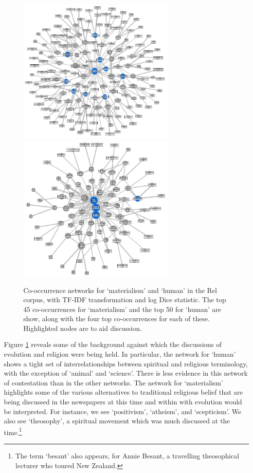 \documentclass{article}
\begin{document}
\begin{figure}
    \centering
    \includegraphics[width=0.7\textwidth]{images/materialism_main.png}
    \includegraphics[width=0.7\textwidth]{images/human_net_main.png}
    \caption{\footnotesize{Co-occurrence networks for `materialism' and `human' in the Rel corpus, with TF-IDF transformation and log Dice statistic. The top 45 co-occurrences for `materialism' and the top 50 for `human' are show,  along with the four top co-occurrences for each of these. Highlighted nodes are to aid discussion.}}
    \label{f:human-net}
\end{figure}

Figure \ref{f:human-net} reveals some of the background against which the discussions of evolution and religion were being held. In particular, the network for `human' shows a tight set of interrelationships between spiritual and religious terminology, with the exception of `animal' and `science'. There is less evidence in this network of contestation than in the other networks. The network for `materialism' highlights some of the various alternatives to traditional religious belief that are being discussed in the newspapers at this time and within with evolution would be interpreted. For instance, we see `positivism', `atheism', and `scepticism'. We also see `theosophy', a spiritual movement which was much discussed at the time.\footnote{The term `besant' also appears, for Annie Besant, a travelling theosophical lecturer who toured New Zealand.} %
\end{document}

